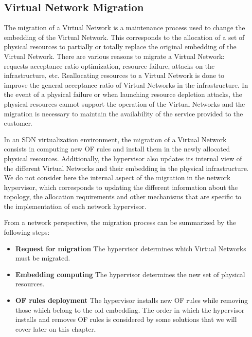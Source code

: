 

\subsection{Virtual Network Migration}
The migration of a Virtual Network is a maintenance process used to change the embedding of the Virtual Network. 
This corresponds to the allocation of a set of physical resources to partially or totally replace the original embedding of the Virtual Network.
There are various reasons to migrate a Virtual Network: requests acceptance ratio optimization, resource failure, attacks on the infrastructure, etc.
Reallocating resources to a Virtual Network is done to improve the general acceptance ratio of Virtual Networks in the infrastructure.
In the event of a physical failure or when launching resource depletion attacks, the physical resources cannot support the operation of the Virtual Networks and the migration is necessary to maintain the availability of the service provided to the customer.

In an SDN virtualization environment, the migration of a Virtual Network consists in computing new OF rules and install them in the newly allocated physical resources. Additionally, the hypervisor also updates its internal view of the different Virtual Networks and their embedding in the physical infrastructure.
We do not consider here the internal aspect of the migration in the network hypervisor, which corresponds to updating the different information about the topology, the allocation requirements and other mechanisms that are specific to the implementation of each network hypervisor.

From a network perspective, the migration process can be summarized by the following steps:

\begin{itemize}
    \item \textbf{Request for migration} The hypervisor determines which Virtual Networks must be migrated.
    \item \textbf{Embedding computing} The hypervisor determines the new set of physical resources.
    \item \textbf{OF rules deployment} The hypervisor installs new OF rules while removing those which belong to the old embedding.
The order in which the hypervisor installs and removes OF rules is considered by some solutions that we will cover later on this chapter.
\end{itemize}

